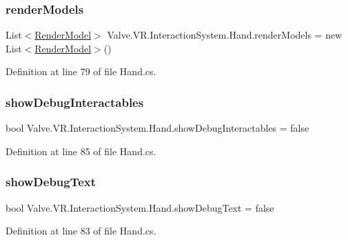\subsubsection{\texorpdfstring{renderModels}{renderModels}}
{\footnotesize\ttfamily List$<$\mbox{\hyperlink{class_valve_1_1_v_r_1_1_interaction_system_1_1_render_model}{Render\+Model}}$>$ Valve.\+V\+R.\+Interaction\+System.\+Hand.\+render\+Models = new List$<$\mbox{\hyperlink{class_valve_1_1_v_r_1_1_interaction_system_1_1_render_model}{Render\+Model}}$>$()\hspace{0.3cm}{\ttfamily [protected]}}



Definition at line 79 of file Hand.\+cs.

\mbox{\label{class_valve_1_1_v_r_1_1_interaction_system_1_1_hand_aad8d9bb0007b16f7934d7cd3229923ae}} 
\subsubsection{\texorpdfstring{showDebugInteractables}{showDebugInteractables}}
{\footnotesize\ttfamily bool Valve.\+V\+R.\+Interaction\+System.\+Hand.\+show\+Debug\+Interactables = false}



Definition at line 85 of file Hand.\+cs.

\mbox{\label{class_valve_1_1_v_r_1_1_interaction_system_1_1_hand_a38a3c203d007f2b2ca33f34649b4edbf}} 
\subsubsection{\texorpdfstring{showDebugText}{showDebugText}}
{\footnotesize\ttfamily bool Valve.\+V\+R.\+Interaction\+System.\+Hand.\+show\+Debug\+Text = false}



Definition at line 83 of file Hand.\+cs.

